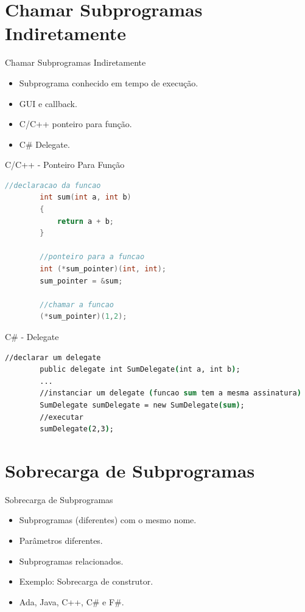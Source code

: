 \section{Chamar Subprogramas Indiretamente}
\begin{frame}{Chamar Subprogramas Indiretamente}
	\begin{itemize}
	  \item Subprograma conhecido em tempo de execução.
	  \item GUI e callback.
	  \item C/C++ ponteiro para função.
	  \item C\# Delegate.
	\end{itemize}
\end{frame}

\begin{frame}[fragile]{C/C++ - Ponteiro Para Função}
	\begin{lstlisting}[language=c]
		//declaracao da funcao
		int sum(int a, int b)
		{
			return a + b;
		}

		//ponteiro para a funcao
		int (*sum_pointer)(int, int);
		sum_pointer = &sum;
		
		//chamar a funcao
		(*sum_pointer)(1,2);
	\end{lstlisting}
\end{frame}

\begin{frame}[fragile]{C\# - Delegate}
	\begin{lstlisting}[language=csh]
		//declarar um delegate
		public delegate int SumDelegate(int a, int b);
		...
		//instanciar um delegate (funcao sum tem a mesma assinatura)
		SumDelegate sumDelegate = new SumDelegate(sum);
		//executar
		sumDelegate(2,3);
	\end{lstlisting}
\end{frame}

\section{Sobrecarga de Subprogramas}
\begin{frame}{Sobrecarga de Subprogramas}
	\begin{itemize}
	  \item Subprogramas (diferentes) com o mesmo nome.
	  \item Parâmetros diferentes.
	  \item Subprogramas relacionados.
	  \item Exemplo: Sobrecarga de construtor.
	  \item Ada, Java, C++, C\# e F\#.
	\end{itemize}
\end{frame}

